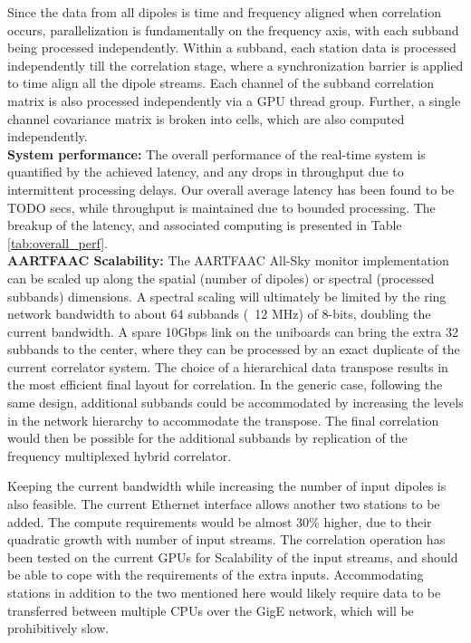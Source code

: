 \documentclass{ws-jai}
\begin{document}
Since the data  from all dipoles is time and  frequency aligned when correlation
occurs,  parallelization  is fundamentally  on  the  frequency axis,  with  each
subband being processed  independently.  Within a subband, each  station data is
processed  independently till  the  correlation stage,  where a  synchronization
barrier is applied  to time align all  the dipole streams.  Each  channel of the
subband  correlation matrix  is also  processed independently  via a  GPU thread
group.  Further, a single channel covariance  matrix is broken into cells, which
are also computed independently.\\


\noindent \textbf {System performance:} The overall performance of the real-time
system is quantified by the achieved latency, and any drops in throughput due to
intermittent processing delays. Our overall average latency has been found to be
TODO secs, while throughput is maintained due to bounded processing. The breakup
of   the   latency,   and   associated   computing   is   presented   in   Table
\ref{tab:overall_perf}.\\

\noindent  \textbf   {AARTFAAC  Scalability:}   The  AARTFAAC   All-Sky  monitor
implementation  can be  scaled  up  along the  spatial  (number  of dipoles)  or
spectral (processed subbands) dimensions. A  spectral scaling will ultimately be
limited by the ring network bandwidth to  about 64 subbands (~12 MHz) of 8-bits,
doubling the current  bandwidth. A spare 10Gbps link on  the uniboards can bring
the extra  32 subbands to the  center, where they  can be processed by  an exact
duplicate of  the current correlator system.  The choice of a  hierarchical data
transpose results  in the most efficient  final layout for correlation.   In the
generic  case,  following   the  same  design,  additional   subbands  could  be
accommodated by increasing the levels in  the network hierarchy to accommodate the
transpose.   The final  correlation would  then be  possible for  the additional
subbands by replication of the frequency multiplexed hybrid correlator.

Keeping the  current bandwidth while increasing  the number of input  dipoles is
also feasible. The current Ethernet interface  allows another two stations to be
added.   The compute  requirements would  be almost  30\% higher,  due to  their
quadratic growth  with number of  input streams.  The correlation  operation has
been tested on the current GPUs for Scalability of the input streams, and should
be  able to  cope  with the  requirements of  the  extra inputs.   Accommodating
stations in addition to  the two mentioned here would likely  require data to be
transferred  between  multiple  CPUs  over  the  GigE  network,  which  will  be
prohibitively slow.\\
\end{document}
